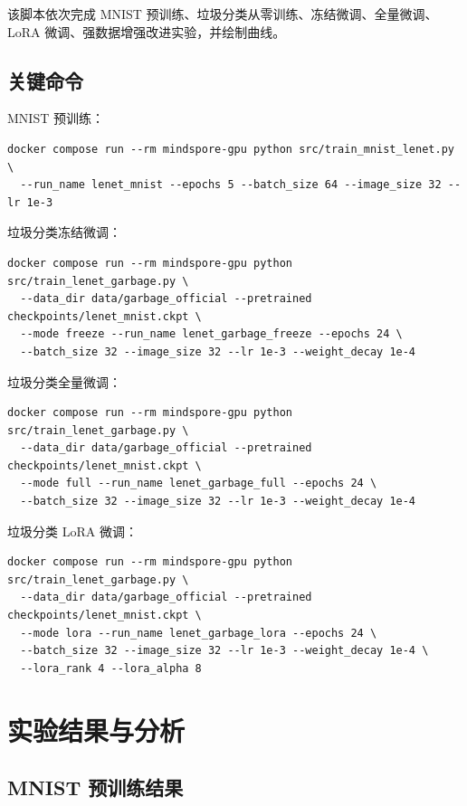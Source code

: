 \documentclass[UTF8,a4paper,zihao=-4]{ctexbook}
\begin{document}
该脚本依次完成 MNIST 预训练、垃圾分类从零训练、冻结微调、全量微调、LoRA 微调、强数据增强改进实验，并绘制曲线。

\section{关键命令}

MNIST 预训练：

\begin{verbatim}
docker compose run --rm mindspore-gpu python src/train_mnist_lenet.py \
  --run_name lenet_mnist --epochs 5 --batch_size 64 --image_size 32 --lr 1e-3
\end{verbatim}

垃圾分类冻结微调：

\begin{verbatim}
docker compose run --rm mindspore-gpu python src/train_lenet_garbage.py \
  --data_dir data/garbage_official --pretrained checkpoints/lenet_mnist.ckpt \
  --mode freeze --run_name lenet_garbage_freeze --epochs 24 \
  --batch_size 32 --image_size 32 --lr 1e-3 --weight_decay 1e-4
\end{verbatim}

垃圾分类全量微调：

\begin{verbatim}
docker compose run --rm mindspore-gpu python src/train_lenet_garbage.py \
  --data_dir data/garbage_official --pretrained checkpoints/lenet_mnist.ckpt \
  --mode full --run_name lenet_garbage_full --epochs 24 \
  --batch_size 32 --image_size 32 --lr 1e-3 --weight_decay 1e-4
\end{verbatim}

垃圾分类 LoRA 微调：

\begin{verbatim}
docker compose run --rm mindspore-gpu python src/train_lenet_garbage.py \
  --data_dir data/garbage_official --pretrained checkpoints/lenet_mnist.ckpt \
  --mode lora --run_name lenet_garbage_lora --epochs 24 \
  --batch_size 32 --image_size 32 --lr 1e-3 --weight_decay 1e-4 \
  --lora_rank 4 --lora_alpha 8
\end{verbatim}

\chapter{实验结果与分析}

\section{MNIST 预训练结果}
\end{document}
